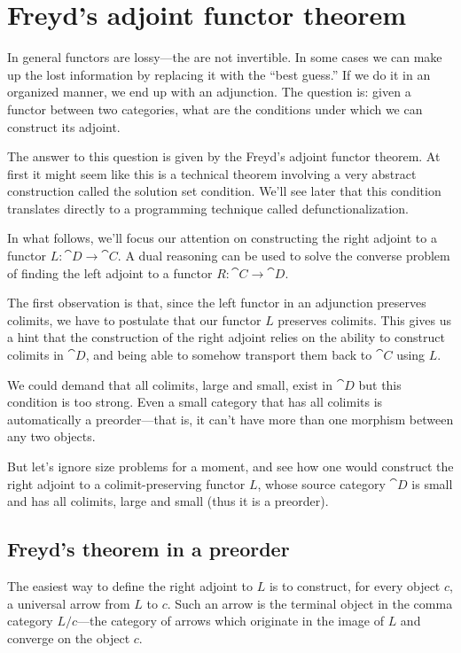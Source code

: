 \documentclass[DaoFP]{subfiles}
\begin{document}
\section{Freyd's adjoint functor theorem}

In general functors are lossy---the are not invertible. In some cases we can make up the lost information by replacing it with the ``best guess.'' If we do it in an organized manner, we end up with an adjunction. The question is: given a functor between two categories, what are the conditions under which we can construct its adjoint. 

The answer to this question is given by the Freyd's adjoint functor theorem. At first it might seem like this is a technical theorem involving a very abstract construction called the solution set condition. We'll see later that this condition translates directly to a programming technique called defunctionalization. 

In what follows, we'll focus our attention on constructing the right adjoint to a functor $L \colon \cat D \to \cat C$. A dual reasoning can be used to solve the converse problem of finding the left adjoint to a functor $R \colon \cat C \to \cat D$.

The first observation is that, since the left functor in an adjunction preserves colimits, we have to postulate that our functor $L$  preserves colimits. This gives us a hint that the construction of the right adjoint relies on the ability to construct colimits in $\cat D$, and being able to somehow transport them back to $\cat C$ using $L$. 

We could demand that all colimits, large and small, exist in $\cat D$ but this condition is too strong. Even a small category that has all colimits is automatically a preorder---that is, it can't have more than one morphism between any two objects. 

But let's ignore size problems for a moment, and see how one would construct the right adjoint to a colimit-preserving functor $L$, whose source category $\cat D$ is small and has all colimits, large and small (thus it is a preorder).

\subsection{Freyd's theorem in a preorder}

The easiest way to define the right adjoint to $L$ is to construct, for every object $c$, a universal arrow from $L$ to $c$. Such an arrow is the terminal object in the comma category $L/c$---the category of arrows which originate in the image of $L$ and converge on the object $c$.
\end{document}
